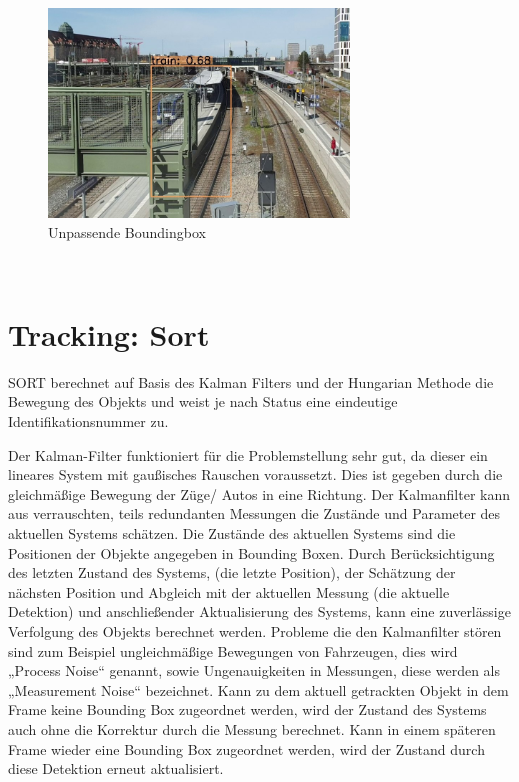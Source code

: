 \documentclass[conference]{IEEEtran}
\begin{document}
	\begin{figure}[!h]
		\begin{center}
			\includegraphics[width=8cm]{Media/Output_564.jpg}
			\caption{Unpassende Boundingbox}
			\label{UB3}
		\end{center}
	\end{figure}\\

	
	
	\section{Tracking: Sort}
	SORT berechnet auf Basis des Kalman Filters und der Hungarian Methode die Bewegung des Objekts und weist je nach Status eine eindeutige Identifikationsnummer zu. 
	
	Der Kalman-Filter funktioniert für die Problemstellung sehr gut, da dieser ein lineares System mit gaußisches Rauschen voraussetzt. Dies ist gegeben durch die gleichmäßige Bewegung der Züge/ Autos in eine Richtung.
	Der Kalmanfilter kann aus verrauschten, teils redundanten Messungen die Zustände und Parameter des aktuellen Systems schätzen. 
	Die Zustände des aktuellen Systems sind die Positionen der Objekte angegeben in Bounding Boxen. Durch Berücksichtigung des letzten Zustand des Systems, (die letzte Position), der Schätzung der nächsten Position und Abgleich mit der aktuellen Messung (die aktuelle Detektion) und anschließender Aktualisierung des Systems, kann eine zuverlässige Verfolgung des Objekts berechnet werden. Probleme die den Kalmanfilter stören sind zum Beispiel ungleichmäßige Bewegungen von Fahrzeugen, dies wird „Process Noise“ genannt, sowie Ungenauigkeiten in Messungen, diese werden als „Measurement Noise“ bezeichnet.
	Kann zu dem aktuell getrackten Objekt in dem Frame keine Bounding Box zugeordnet werden, wird der Zustand des Systems auch ohne die Korrektur durch die Messung berechnet. Kann in einem späteren Frame wieder eine Bounding Box zugeordnet werden, wird der Zustand durch diese Detektion erneut aktualisiert.
	
\end{document}
